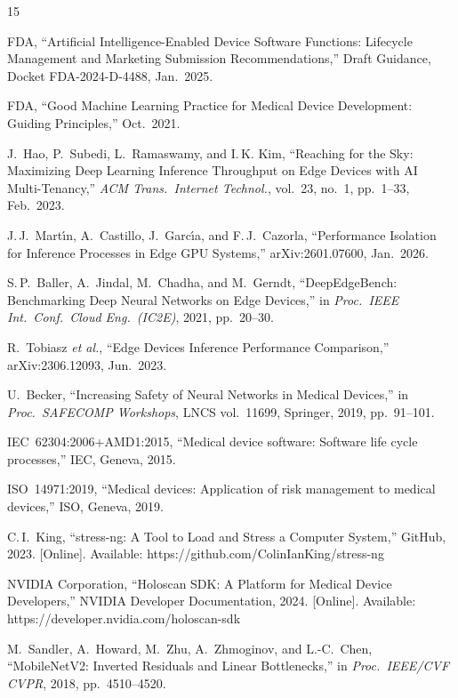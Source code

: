 \documentclass[journal,10pt,twocolumn]{IEEEtran}
\begin{document}
\begin{thebibliography}{15}

FDA, ``Artificial Intelligence-Enabled Device Software Functions:
Lifecycle Management and Marketing Submission Recommendations,''
Draft Guidance, Docket FDA-2024-D-4488, Jan.\ 2025.

FDA, ``Good Machine Learning Practice for Medical Device Development:
Guiding Principles,'' Oct.\ 2021.

J.~Hao, P.~Subedi, L.~Ramaswamy, and I.\,K. Kim,
``Reaching for the Sky: Maximizing Deep Learning Inference Throughput
on Edge Devices with AI Multi-Tenancy,''
\emph{ACM Trans.\ Internet Technol.}, vol.~23, no.~1, pp.~1--33,
Feb.\ 2023.

J.\,J.~Mart\'{\i}n, A.~Castillo, J.~Garc\'{\i}a, and F.\,J.~Cazorla,
``Performance Isolation for Inference Processes in Edge GPU Systems,''
arXiv:2601.07600, Jan.\ 2026.

S.\,P.~Baller, A.~Jindal, M.~Chadha, and M.~Gerndt,
``DeepEdgeBench: Benchmarking Deep Neural Networks on Edge Devices,''
in \emph{Proc.\ IEEE Int.\ Conf.\ Cloud Eng.\ (IC2E)}, 2021,
pp.~20--30.

R.~Tobiasz \emph{et al.},
``Edge Devices Inference Performance Comparison,''
arXiv:2306.12093, Jun.\ 2023.

U.~Becker,
``Increasing Safety of Neural Networks in Medical Devices,''
in \emph{Proc.\ SAFECOMP Workshops}, LNCS vol.~11699,
Springer, 2019, pp.~91--101.

IEC~62304:2006+AMD1:2015, ``Medical device software: Software life cycle processes,'' IEC, Geneva, 2015.

ISO~14971:2019, ``Medical devices: Application of risk management to medical devices,'' ISO, Geneva, 2019.

C.\,I.~King, ``stress-ng: A Tool to Load and Stress a Computer
System,'' GitHub, 2023. [Online]. Available:
https://github.com/ColinIanKing/stress-ng

NVIDIA Corporation, ``Holoscan SDK: A Platform for Medical Device
Developers,'' NVIDIA Developer Documentation, 2024. [Online].
Available: https://developer.nvidia.com/holoscan-sdk

M.~Sandler, A.~Howard, M.~Zhu, A.~Zhmoginov, and L.-C.~Chen,
``MobileNetV2: Inverted Residuals and Linear Bottlenecks,''
in \emph{Proc.\ IEEE/CVF CVPR}, 2018, pp.~4510--4520.


\end{thebibliography}
\end{document}
